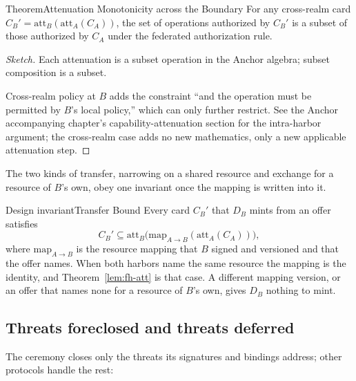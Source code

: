 \documentclass[11pt,a4paper]{article}
\theoremstyle{definition}
\theoremstyle{remark}
\begin{document}
\begin{pdclaim}{Theorem}{Attenuation Monotonicity across the Boundary}
\setlength{\parskip}{4pt plus 1pt}
\label{lem:fh-att}
For any cross-realm card $C_B' = \mathrm{att}_B(\mathrm{att}_A(C_A))$, the set of operations authorized by $C_B'$ is a subset of those authorized by $C_A$ under the federated authorization rule.
\end{pdclaim}

\begin{proof}[Sketch]
\setlength{\parskip}{4pt plus 1pt}
Each attenuation is a subset operation in the Anchor algebra; subset composition is a subset.

Cross-realm policy at $B$ adds the constraint ``and the operation must be permitted by $B$'s local policy,'' which can only further restrict. See the Anchor accompanying chapter's capability-attenuation section for the intra-harbor argument; the cross-realm case adds no new mathematics, only a new applicable attenuation step.
\end{proof}

The two kinds of transfer, narrowing on a shared resource and exchange for a resource of $B$'s own, obey one invariant once the mapping is written into it.

\begin{pdclaim}{Design invariant}{Transfer Bound}
\setlength{\parskip}{4pt plus 1pt}
\label{inv:fh-transfer}
Every card $C_B'$ that $D_B$ mints from an offer satisfies
\[
C_B' \subseteq \mathrm{att}_B\bigl(\mathrm{map}_{A\to B}(\mathrm{att}_A(C_A))\bigr),
\]
where $\mathrm{map}_{A\to B}$ is the resource mapping that $B$ signed and versioned and that the offer names. When both harbors name the same resource the mapping is the identity, and Theorem~\ref{lem:fh-att} is that case. A different mapping version, or an offer that names none for a resource of $B$'s own, gives $D_B$ nothing to mint.
\end{pdclaim}

\pdexercisepointer{\ref{ex:fh-xfer-offer}}{\ref{ex:fh-xfer-attenuation}}{\pageref{ex:fh-xfer-offer}}



\subsection{Threats foreclosed and threats deferred}\label{sec:fh-xfer-threats}

The ceremony closes only the threats its signatures and bindings address;
other protocols handle the rest:
\end{document}
